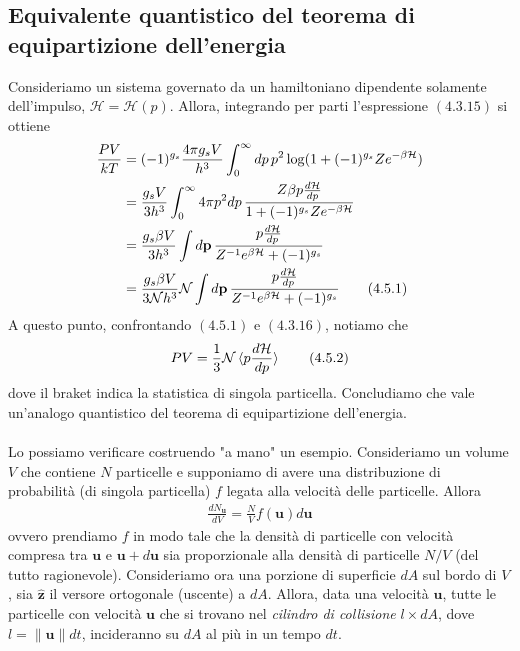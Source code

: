 \documentclass{article}
\begin{document}
\newpage
\subsection{Equivalente quantistico del teorema di equipartizione dell'energia}
Consideriamo un sistema governato da un hamiltoniano dipendente solamente dell'impulso, $\mathcal{H} = \mathcal{H}(p)$. Allora, integrando per parti l'espressione $(4.3.15)$ si ottiene
\begin{align}
    \frac{PV}{kT} &= (-1)^{g_s}\frac{4\pi g_sV}{h^3}\int_0^\infty dp \, p^2\log(1 + (-1)^{g_s}Ze^{-\beta\mathcal{H}}) \notag \\
    &= \frac{g_sV}{3h^3}\int_0^\infty 4\pi p^2dp \, \frac{Z\beta p\frac{d\mathcal{H}}{dp}}{1 + (-1)^{g_s}Ze^{-\beta\mathcal{H}}} \notag \\
    &= \frac{g_s\beta V}{3h^3}\int d\mathbf{p} \, \frac{p\frac{d\mathcal{H}}{dp}}{Z^{-1}e^{\beta\mathcal{H}} + (-1)^{g_s}} \notag \\
    &= \frac{g_s\beta V}{3\mathcal{N}h^3}\mathcal{N}\int d\mathbf{p} \, \frac{p\frac{d\mathcal{H}}{dp}}{Z^{-1}e^{\beta\mathcal{H}} + (-1)^{g_s}} \tag{4.5.1}
\end{align}
A questo punto, confrontando $(4.5.1)$ e $(4.3.16)$, notiamo che
\begin{align}
    PV = \frac{1}{3}\mathcal{N}\braket{p\frac{d\mathcal{H}}{dp}} \tag{4.5.2}
\end{align}
dove il braket indica la statistica di singola particella. Concludiamo che vale un'analogo quantistico del teorema di equipartizione dell'energia. \\ \\
Lo possiamo verificare costruendo "a mano" un esempio. Consideriamo un volume $V$ che contiene $N$ particelle e supponiamo di avere una distribuzione di probabilità (di singola particella) $f$ legata alla velocità delle particelle. Allora
\begin{align}
    \frac{dN_{\mathbf{u}}}{dV} = \frac{N}{V}f(\mathbf{u})d\mathbf{u} \tag{4.5.3}
\end{align}
ovvero prendiamo $f$ in modo tale che la densità di particelle con velocità compresa tra $\mathbf{u}$ e $\mathbf{u} + d\mathbf{u}$ sia proporzionale alla densità di particelle $N/V$ (del tutto ragionevole). Consideriamo ora una porzione di superficie $dA$ sul bordo di $V$, sia $\hat{\mathbf{z}}$ il versore ortogonale (uscente) a $dA$. Allora, data una velocità $\mathbf{u}$, tutte le particelle con velocità $\mathbf{u}$ che si trovano nel \textit{cilindro di collisione} $l \times dA$, dove $l = \|\mathbf{u}\|dt$, incideranno su $dA$ al più in un tempo $dt$. \\
\end{document}
